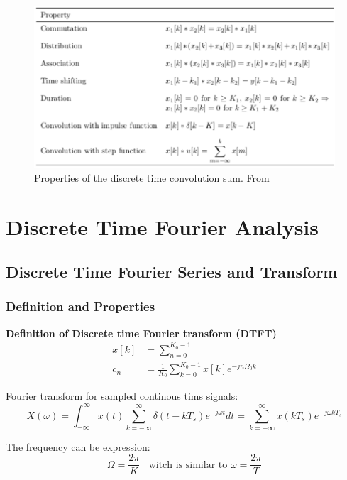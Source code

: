 \begin{figure}[!ht]
    \centering
    \includegraphics[width=12cm]{image/properties_of_the_discreate_time_convolution_sum.pdf}
    \caption{Properties of the discrete time convolution sum. From \cite{}}
    \label{fig:properties_of_the_discreate_time_convolution_sum}
\end{figure}


\section{Discrete Time Fourier Analysis}
\subsection{Discrete Time Fourier Series and Transform}
\subsubsection{Definition and Properties}
\textbf{Definition of Discrete time Fourier transform (DTFT)}
\begin{align*}
    x[k] &= \sum_{n=0}^{K_0-1} \\
    c_n  &= \frac{1}{K_0}\sum_{k=0}^{K_0-1} x[k]e^{-jn\Omega_0k}
\end{align*}

Fourier transform for sampled continous tims signals:
\begin{equation*}
    X(\omega) 
    = \int_{-\infty}^{\infty}x(t) \sum_{k=-\infty}^{\infty} \delta(t-kT_s)e^{-j\omega t}dt
    = \sum_{k=-\infty}^{\infty} x(kT_s)e^{-j\omega kT_s}
\end{equation*}

The frequency can be expression:
\begin{equation*}
    \Omega = \frac{2\pi}{K} \;\; \text{ witch is similar to } \omega=\frac{2\pi}{T}
\end{equation*}

